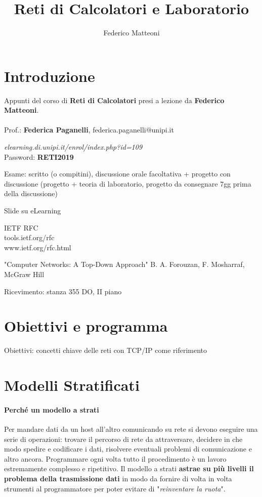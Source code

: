 \documentclass[10pt]{article}
\begin{document}
\title{Reti di Calcolatori e Laboratorio}
\author{Federico Matteoni}
\date{ }
\renewcommand*\contentsname{Indice}

\maketitle
\tableofcontents
\pagebreak
\section{Introduzione}
Appunti del corso di \textbf{Reti di Calcolatori} presi a lezione da \textbf{Federico Matteoni}.\\\\
Prof.: \textbf{Federica Paganelli}, federica.paganelli@unipi.it\\
\begin{list}{-}{Riferimenti web:}
\item \emph{elearning.di.unipi.it/enrol/index.php?id=109}\\Password: \textbf{RETI2019}
\end{list}
Esame: scritto (o compitini), discussione orale facoltativa + progetto con discussione (progetto + teoria di laboratorio, progetto da consegnare 7gg prima della discussione)\\
\begin{list}{-}{Libri e materiale didattico:}
\item Slide su eLearning
\item IETF RFC\\tools.ietf.org/rfc\\www.ietf.org/rfc.html
\item "Computer Networks: A Top-Down Approach" B. A. Forouzan, F. Mosharraf, McGraw Hill
\end{list}
Ricevimento: stanza 355 DO, II piano

\section{Obiettivi e programma}
Obiettivi: concetti chiave delle reti con TCP/IP come riferimento

\section{Modelli Stratificati}
\paragraph{Perché un modello a strati} Per mandare dati da un host all'altro comunicando su rete si devono eseguire una serie di operazioni: trovare il percorso di rete da attraversare, decidere in che modo spedire e codificare i dati, risolvere eventuali problemi di comunicazione e altro ancora. Programmare ogni volta tutto il procedimento è un lavoro estremamente complesso e ripetitivo. Il modello a strati \textbf{astrae su più livelli il problema della trasmissione dati} in modo da fornire di volta in volta strumenti al programmatore per poter evitare di "\textit{reinventare la ruota}".
\end{document}
